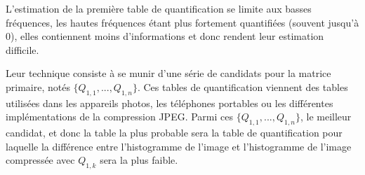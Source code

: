 \documentclass[utf8,final]{stageM2R} %
\begin{document}
L'estimation de la première table de quantification se limite aux basses fréquences, les hautes fréquences étant plus fortement quantifiées (souvent jusqu'à 0), elles contiennent moins d'informations et donc rendent leur estimation difficile.

Leur technique consiste à se munir d'une série de candidats pour la matrice primaire, notés $\{Q_{1,1},...,Q_{1,n}\}$. Ces tables de quantification viennent des tables utilisées dans les appareils photos, les téléphones portables ou les différentes implémentations de la compression JPEG. Parmi ces $\{Q_{1,1},...,Q_{1,n}\}$, le meilleur candidat, et donc la table la plus probable sera la table de quantification pour laquelle la différence entre l'histogramme de l'image et l'histogramme de l'image compressée avec $Q_{1,k}$ sera la plus faible.
\end{document}
